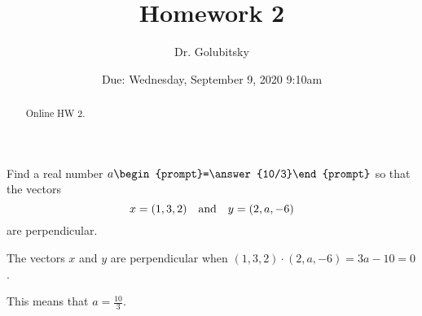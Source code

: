 \documentclass{ximera}
\title{Homework 2}
\author{Dr. Golubitsky}
\date{Due: Wednesday, September 9, 2020 \@9:10am}
\begin{document}
\begin{abstract}
Online HW 2.
\end{abstract}
\maketitle


\problemlabel



\begin{exercise} \label{c1.4.2}
Find a real number $a\begin{prompt}=\answer{10/3}\end{prompt}$ so that the vectors
\[
x = (1,3,2) \quad\mbox{and}\quad y = (2,a,-6)
\]
are perpendicular.
\begin{hint}
  The vectors $x$ and $y$ are perpendicular when
$(1,3,2) \cdot (2,a,-6) = 3a - 10 = 0$.
\end{hint}
\begin{hint}
  This means that $a = \frac{10}{3}$.
\end{hint}

%
%
\end{exercise}




\problemlabel
\end{document}

